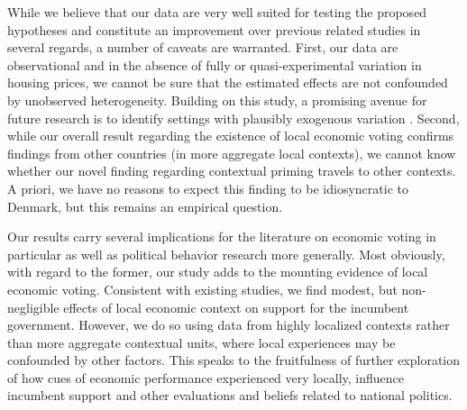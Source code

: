 \documentclass[12pt,a4paper]{article}
\begin{document}
	While we believe that our data are very well suited for testing the proposed hypotheses and constitute an improvement over previous related studies in several regards, a number of caveats are warranted. First, our data are observational and in the absence of fully or quasi-experimental variation in housing prices, we cannot be sure that the estimated effects are not confounded by unobserved heterogeneity. Building on this study, a promising avenue for future research is to identify settings with plausibly exogenous variation \citep{jerzak2016property}. Second, while our overall result regarding the existence of local economic voting confirms findings from other countries (in more aggregate local contexts), we cannot know whether our novel finding regarding contextual priming travels to other contexts. A priori, we have no reasons to expect this finding to be idiosyncratic to Denmark, but this remains an empirical question. 
	
	Our results carry several implications for the literature on economic voting in particular as well as political behavior research more generally. Most obviously, with regard to the former, our study adds to the mounting evidence of local economic voting. Consistent with existing studies, we find modest, but non-negligible effects \cite{healy2013retrospective} of local economic context on support for the incumbent government. However, we do so using data from highly localized contexts rather than more aggregate contextual units, where local experiences may be confounded by other factors. This speaks to the fruitfulness of further exploration of how cues of economic performance experienced very locally, influence incumbent support and other evaluations and beliefs related to national politics. 
	
\end{document}
